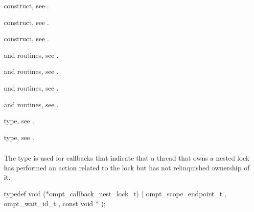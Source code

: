 \begin{crossrefs}
\item {} construct, see .

\item {} construct, see .

\item {} construct, see .

\item {} and  routines,
see .

\item {} and  routines,
see .

\item {} and  routines,
see .

\item {} and  routines,
see .

\item {} type, see .

\item {} type, see .
\end{crossrefs}



\subsubsection{}
\label{sec:ompt_callback_nest_lock_t}
\summary
The  type is used for callbacks that 
indicate that a thread that owns a nested lock has performed an action 
related to the lock but has not relinquished ownership of it.

\format
\begin{ccppspecific}
\begin{omptCallback}
typedef void (*ompt_callback_nest_lock_t) (
  ompt_scope_endpoint_t ,
  ompt_wait_id_t ,
  const void *
);
\end{omptCallback}
\end{ccppspecific}

